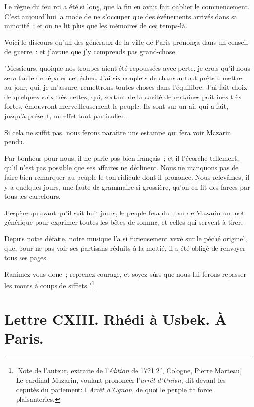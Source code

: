 \documentclass[french,twoside]{book} %
\newcommand{\dateline}[1]{\medskip{\RaggedLeft{#1}\par}\bigskip}
\begin{document}
\noindent Le règne du feu roi a été si long, que la fin en avait fait oublier le commencement. C’est aujourd’hui la mode de ne s’occuper que des événements arrivés dans sa minorité ; et on ne lit plus que les mémoires de ces temps-là.\par
Voici le discours qu’un des généraux de la ville de Paris prononça dans un conseil de guerre : et j’avoue que j’y comprends pas grand-chose.\par
"Messieurs, quoique nos troupes aient été repoussées avec perte, je crois qu’il nous sera facile de réparer cet échec. J’ai six couplets de chanson tout prêts à mettre au jour, qui, je m’assure, remettrons toutes choses dans l’équilibre. J’ai fait choix de quelques voix très nettes, qui, sortant de la cavité de certaines poitrines très fortes, émouvront merveilleusement le peuple. Ils sont sur un air qui a fait, jusqu’à présent, un effet tout particulier.\par
Si cela ne suffit pas, nous ferons paraître une estampe qui fera voir Mazarin pendu.\par
Par bonheur pour nous, il ne parle pas bien français ; et il l’écorche tellement, qu’il n’est pas possible que ses affaires ne déclinent. Nous ne manquons pas de faire bien remarquer au peuple le ton ridicule dont il prononce. Nous relevâmes, il y a quelques jours, une faute de grammaire si grossière, qu’on en fit des farces par tous les carrefours.\par
J’espère qu’avant qu’il soit huit jours, le peuple fera du nom de Mazarin un mot générique pour exprimer toutes les bêtes de somme, et celles qui servent à tirer.\par
Depuis notre défaite, notre musique l’a si furieusement vexé sur le péché originel, que, pour ne pas voir ses partisans réduits à la moitié, il a été obligé de renvoyer tous ses pages.\par
Ranimez-vous donc ; reprenez courage, et soyez sûrs que nous lui ferons repasser les monts à coups de sifflets."\footnote{[Note de l’auteur, extraite de l’{\itshape édition} de 1721 2\textsuperscript{e}, Cologne, Pierre Marteau] Le cardinal Mazarin, voulant prononcer l’{\itshape arrêt d’Union}, dit devant les députés du parlement: l’{\itshape Arrêt d’Ognon}, de quoi le peuple fit force plaisanteries.}\par

\dateline{De Paris, le 4 de la lune de Chahban, 1718.}
\section[{Lettre CXIII. Rhédi à Usbek. À Paris.}]{Lettre CXIII. Rhédi à Usbek. À Paris.}\renewcommand{\leftmark}{Lettre CXIII. Rhédi à Usbek. À Paris.}
\end{document}
